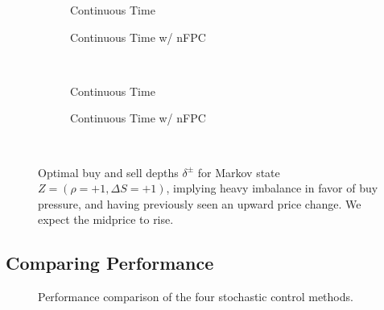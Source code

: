 \begin{figure}
\centering
\begin{subfigure}{.35\linewidth}
  \centering
  \setlength\figureheight{\linewidth} 
  \setlength\figurewidth{\linewidth}
  
  \caption{Continuous Time}
\end{subfigure}%
\hfil%
\begin{subfigure}{.35\linewidth}
  \centering
  \setlength\figureheight{\linewidth}
  \setlength\figurewidth{\linewidth}
   
  \caption{Continuous Time w/ nFPC}
\end{subfigure}\\
\vspace{1cm}
\begin{subfigure}{.35\linewidth}
  \centering
  \setlength\figureheight{\linewidth} 
  \setlength\figurewidth{\linewidth}
  
  \caption{Continuous Time}
\end{subfigure}%
\hfil%
\begin{subfigure}{.35\linewidth}
  \centering
  \setlength\figureheight{\linewidth}
  \setlength\figurewidth{\linewidth}
   
  \caption{Continuous Time w/ nFPC}
\end{subfigure}\\
\vspace{1cm}
\begin{subfigure}{\linewidth}
  \centering
   
\end{subfigure}%
  \caption{Optimal buy and sell depths $\delta^{\pm}$ for Markov state $Z=(\rho = +1, \Delta S = +1)$, implying heavy imbalance in favor of buy pressure, and having previously seen an upward price change. We expect the midprice to rise.}
  \label{fig:comp_calib_dm_z15}
\end{figure}

\FloatBarrier
\subsection{Comparing Performance}
\begin{figure}
  \centering
  \setlength\figureheight{\linewidth} 
  \setlength\figurewidth{\linewidth}
  
  \caption{Performance comparison of the four stochastic control methods.}
  \label{fig:ORCL_comp4stoch}
\end{figure}

